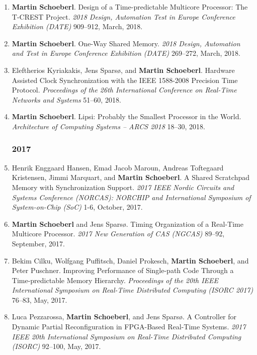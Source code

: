 \begin{enumerate}
\item {\bf Martin Schoeberl}.
 Design of a Time-predictable Multicore Processor: The T-CREST Project.
 \emph{2018 Design, Automation Test in Europe Conference Exhibition (DATE)} 909--912, March, 2018.

\item {\bf Martin Schoeberl}.
 One-Way Shared Memory.
 \emph{2018 Design, Automation and Test in Europe Conference Exhibition (DATE)} 269--272, March, 2018.

\item Eleftherios Kyriakakis, Jens Spars{\o}, and {\bf Martin Schoeberl}.
 Hardware Assisted Clock Synchronization with the IEEE 1588-2008 Precision Time Protocol.
 \emph{Proceedings of the 26th International Conference on Real-Time Networks and Systems} 51--60, 2018.

\item {\bf Martin Schoeberl}.
 Lipsi: Probably the Smallest Processor in the World.
 \emph{Architecture of Computing Systems -- ARCS 2018} 18--30, 2018.


\subsubsection*{2017}

\item Henrik Enggaard Hansen, Emad Jacob Maroun, Andreas Toftegaard Kristensen, Jimmi Marquart, and {\bf Martin Schoeberl}.
 A Shared Scratchpad Memory with Synchronization Support.
 \emph{2017 IEEE Nordic Circuits and Systems Conference (NORCAS): NORCHIP and International Symposium of System-on-Chip (SoC)} 1-6, October, 2017.

\item {\bf Martin Schoeberl} and Jens Spars{\o}.
 Timing Organization of a Real-Time Multicore Processor.
 \emph{2017 New Generation of CAS (NGCAS)} 89--92, September, 2017.

\item Bekim Cilku, Wolfgang Puffitsch, Daniel Prokesch, {\bf Martin Schoeberl}, and Peter Puschner.
 Improving Performance of Single-path Code Through a Time-predictable Memory Hierarchy.
 \emph{Proceedings of the 20th IEEE International Symposium on Real-Time Distributed Computing (ISORC 2017)} 76--83, May, 2017.

\item Luca Pezzarossa, {\bf Martin Schoeberl}, and Jens Spars{\o}.
 A Controller for Dynamic Partial Reconfiguration in FPGA-Based Real-Time Systems.
 \emph{2017 IEEE 20th International Symposium on Real-Time Distributed Computing (ISORC)} 92--100, May, 2017.


\end{enumerate}
